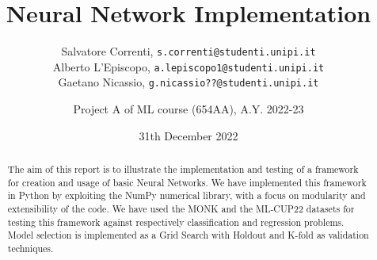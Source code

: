 \documentclass[12pt]{article}
\title{Neural Network Implementation}
\author{Salvatore Correnti, \texttt{s.correnti@studenti.unipi.it}\\
  Alberto L'Episcopo, \texttt{a.lepiscopo1@studenti.unipi.it}\\
  Gaetano Nicassio, \texttt{g.nicassio??@studenti.unipi.it}
  \and Project A of ML course (654AA), A.Y. 2022-23}
\date{31th December 2022}
\begin{document}
\maketitle

\begin{abstract}
  The aim of this report is to illustrate the implementation and testing of a framework for creation and usage of basic Neural Networks.
  We have implemented this framework in Python by exploiting the NumPy numerical library, with a focus on modularity and extensibility of the code.
  We have used the MONK and the ML-CUP22 datasets for testing this framework against respectively classification and regression problems.
  Model selection is implemented as a Grid Search with Holdout and K-fold as validation techniques.
 
\end{abstract}






\end{document}
